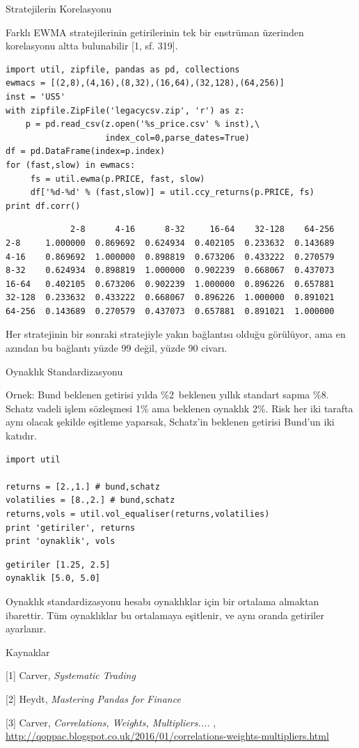 \documentclass[12pt,fleqn]{article}\usepackage{../../common}
\begin{document}
Stratejilerin Korelasyonu

Farklı EWMA stratejilerinin getirilerinin tek bir enstrüman üzerinden
korelasyonu altta bulunabilir [1, sf. 319]. 

\begin{verbatim}
import util, zipfile, pandas as pd, collections
ewmacs = [(2,8),(4,16),(8,32),(16,64),(32,128),(64,256)]
inst = 'US5'
with zipfile.ZipFile('legacycsv.zip', 'r') as z:
    p = pd.read_csv(z.open('%s_price.csv' % inst),\
                    index_col=0,parse_dates=True)
df = pd.DataFrame(index=p.index)
for (fast,slow) in ewmacs:
     fs = util.ewma(p.PRICE, fast, slow)
     df['%d-%d' % (fast,slow)] = util.ccy_returns(p.PRICE, fs)
print df.corr()
\end{verbatim}

\begin{verbatim}
             2-8      4-16      8-32     16-64    32-128    64-256
2-8     1.000000  0.869692  0.624934  0.402105  0.233632  0.143689
4-16    0.869692  1.000000  0.898819  0.673206  0.433222  0.270579
8-32    0.624934  0.898819  1.000000  0.902239  0.668067  0.437073
16-64   0.402105  0.673206  0.902239  1.000000  0.896226  0.657881
32-128  0.233632  0.433222  0.668067  0.896226  1.000000  0.891021
64-256  0.143689  0.270579  0.437073  0.657881  0.891021  1.000000
\end{verbatim}

Her stratejinin bir sonraki stratejiyle yakın bağlantısı olduğu görülüyor, ama
en azından bu bağlantı yüzde 99 değil, yüzde 90 civarı. 

Oynaklık Standardizasyonu 

Ornek: Bund beklenen getirisi yılda \%2\, beklenen yıllık standart sapma \%8.
Schatz vadeli işlem sözleşmesi 1\% ama beklenen oynaklık 2\%. Risk her iki
tarafta aynı olacak şekilde eşitleme yaparsak, Schatz'in beklenen getirisi
Bund'un iki katıdır.

\begin{verbatim}
import util

returns = [2.,1.] # bund,schatz
volatilies = [8.,2.] # bund,schatz
returns,vols = util.vol_equaliser(returns,volatilies)
print 'getiriler', returns
print 'oynaklik', vols
\end{verbatim}

\begin{verbatim}
getiriler [1.25, 2.5]
oynaklik [5.0, 5.0]
\end{verbatim}

Oynaklık standardizasyonu hesabı oynaklıklar için bir ortalama almaktan
ibarettir. Tüm oynaklıklar bu ortalamaya eşitlenir, ve aynı oranda
getiriler ayarlanır. 

Kaynaklar

[1] Carver, {\em Systematic Trading}

[2] Heydt, {\em Mastering Pandas for Finance}

[3] Carver, {\em Correlations, Weights, Multipliers.... }, \url{http://qoppac.blogspot.co.uk/2016/01/correlations-weights-multipliers.html}
\end{document}
